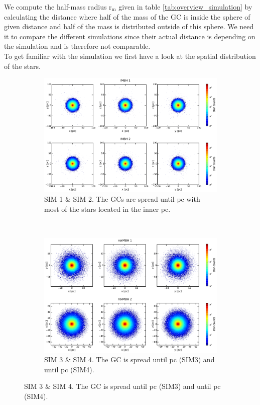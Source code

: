 \par We compute the half-mass radius \(\mathrm{r_m}\) given in table \ref{tab:overview_simulation} by calculating the distance where half of the mass of the \ac{GC} is inside the sphere of given distance and half of the mass is distributed outside of this sphere. We need it to compare the different simulations since their actual distance is depending on the simulation and is therefore not comparable. 
\\
To get familiar with the simulation we first have a look at the spatial distribution of the stars.
\begin{figure}[htbp] 
\centering
\begin{subfigure}{0.9\textwidth}
	\centering
  	\includegraphics[width=\textwidth]{Plots/position_scatter_plot_IMBH.pdf}
  	\caption{SIM 1 \& SIM 2. The \acp{GC} are spread until \unit[100]{pc} with most of the stars located in the inner \unit[40]{pc}.}
 	\label{fig:pos_scat_IMBH}
\end{subfigure}
\\
\begin{subfigure}{0.9\textwidth}
	\centering
  	\includegraphics[width=\textwidth]{Plots/position_scatter_plot_noIMBH.pdf}
  	\caption{SIM 3 \& SIM 4. The \ac{GC} is spread until \unit[90]{pc} (SIM3) and until \unit[60]{pc} (SIM4).}
 	\label{fig:pos_scat_noIMBH}
\end{subfigure}


\end{figure}
